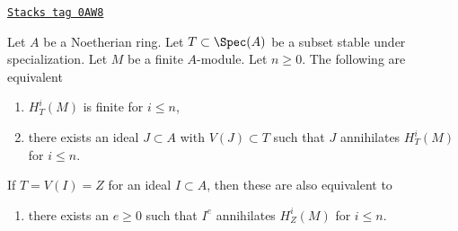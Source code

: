 \begin{lemma}
\label{local-cohomology-lemma-check-finiteness-local-cohomology-by-annihilator}
\href{https://stacks.math.columbia.edu/tag/0AW8}{\texttt{Stacks tag 0AW8}}

\begin{reference}
\cite[Lemma 3]{Faltings-annulators}
\end{reference}
Let $A$ be a Noetherian ring. Let $T \subset \Spec(A)$ be a subset stable
under specialization. Let $M$ be a finite $A$-module. Let $n \geq 0$.
The following are equivalent
\begin{enumerate}
\item $H^i_T(M)$ is finite for $i \leq n$,
\item there exists an ideal $J \subset A$ with $V(J) \subset T$
such that $J$ annihilates $H^i_T(M)$ for $i \leq n$.
\end{enumerate}
If $T = V(I) = Z$ for an ideal $I \subset A$, then these are also
equivalent to
\begin{enumerate}
\item[(3)] there exists an $e \geq 0$ such that $I^e$ annihilates
$H^i_Z(M)$ for $i \leq n$.
\end{enumerate}
\end{lemma}

